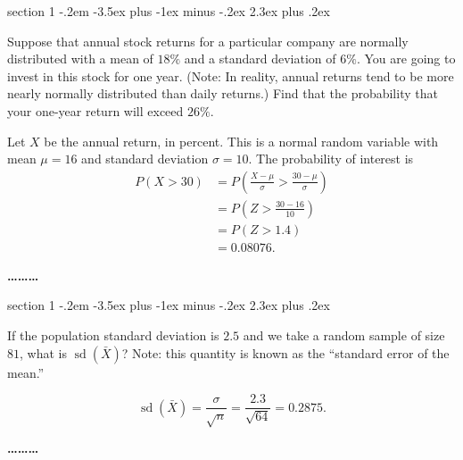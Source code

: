 \documentclass[11pt]{exam}
\makeatletter
\newenvironment{problem}{\@startsection
       {section}
       {1}
       {-.2em}
       {-3.5ex plus -1ex minus -.2ex}
       {2.3ex plus .2ex}
       {\pagebreak[3]%
       \large\bf\noindent{Problem }
       }
       }
       {%
       \begin{center}\large\bf \ldots\ldots\ldots\end{center}}
\DeclareMathOperator*{\sd}{sd}
\makeatother
\begin{document}
\begin{problem}{}

Suppose that annual stock returns for a particular company are normally
distributed with a mean of $18\%$ and a standard deviation of $6\%$. You are
going to invest in this stock for one year.  (Note: In reality, annual returns
tend to be more nearly normally distributed than daily returns.)
Find that the probability that your one-year return will exceed $26\%$.

\begin{solution}
Let $X$ be the annual return, in percent.  This is a normal random variable
with mean $\mu = 16$ and standard deviation $\sigma = 10$.  The probability of
interest is
\begin{align*}
  P(X > 30)
    &= P\left(\frac{X - \mu}{\sigma} > \frac{30 - \mu}{\sigma}\right) \\
    &= P\left(Z > \frac{30 - 16}{10}\right) \\
    &= P(Z > 1.4) \\
    &= 0.08076.
\end{align*}
\end{solution}


\end{problem}



\begin{problem}{}

If the population standard deviation is $2.5$ and we take a random sample of
size $81$, what is $\sd (\bar X)$?   Note: this quantity is known as
the ``standard error of the mean.'' 

\begin{solution}
\[
  \sd(\bar X) = \frac{\sigma}{\sqrt{n}} = \frac{2.3}{\sqrt{64}} = 0.2875.
\]

\end{solution}
\end{problem}
\end{document}
